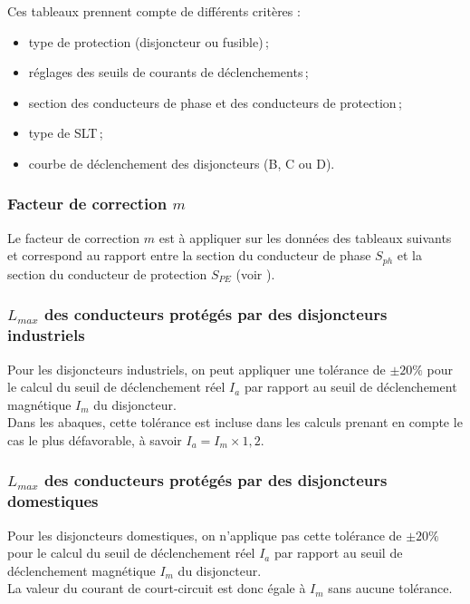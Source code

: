 Ces tableaux prennent compte de différents critères :
\begin{itemize}
\item type de protection (disjoncteur ou fusible)\,;
\item réglages des seuils de courants de déclenchements\,;
\item section des conducteurs de phase et des conducteurs de protection\,;
\item type de SLT\,;
\item courbe de déclenchement des disjoncteurs (B, C ou D).
\end{itemize}


\subsubsection{Facteur de correction $m$\label{subsubsec:facteur_correction_m}}

Le facteur de correction $m$ est à appliquer sur les données des tableaux suivants et correspond au rapport entre la section du conducteur de phase $S_{ph}$ et la section du conducteur de protection $S_{PE}$ (voir ).\\



\subsubsection{$L_{max}$ des conducteurs protégés par des disjoncteurs industriels}

Pour les disjoncteurs industriels, on peut appliquer une tolérance de $\pm20\%$ pour le calcul du seuil de déclenchement réel $I_a$ par rapport au seuil de déclenchement magnétique $I_m$ du disjoncteur.\\
Dans les abaques, cette tolérance est incluse dans les calculs prenant en compte le cas le plus défavorable, à savoir $I_{a}=I_{m} \times 1,2$.



\subsubsection{$L_{max}$ des conducteurs protégés par des disjoncteurs domestiques}

Pour les disjoncteurs domestiques, on n'applique pas cette tolérance de $\pm20\%$ pour le calcul du seuil de déclenchement réel $I_a$ par rapport au seuil de déclenchement magnétique $I_m$ du disjoncteur.\\ La valeur du courant de court-circuit est donc égale à $I_m$ sans aucune tolérance.

